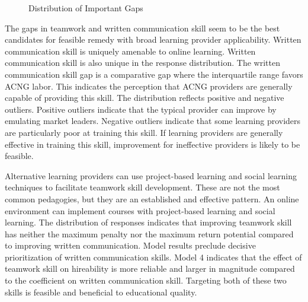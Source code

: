 \documentclass[review]{elsarticle}
\begin{document}
\begin{figure}[h!]
    \centering
    \caption{Distribution of Important Gaps}
    \label{fig:important_gaps}
\end{figure}

The gaps in teamwork and written communication skill seem to be the best candidates for
feasible remedy with broad learning provider applicability.
Written communication skill is uniquely amenable to online learning.
Written communication skill is also unique in the response distribution.
The written communication skill gap is a comparative gap where the interquartile range favors ACNG labor.
This indicates the perception that ACNG providers are generally capable of providing this skill.
The distribution reflects positive and negative outliers.
Positive outliers indicate that the typical provider can improve by emulating market leaders.
Negative outliers indicate that some learning providers are particularly poor at training this skill.
If learning providers are generally effective in training this skill,
improvement for ineffective providers is likely to be feasible.

Alternative learning providers can use project-based learning and social learning
techniques to facilitate teamwork skill development.
These are not the most common pedagogies, but they are an established and effective pattern.
An online environment can implement courses with project-based learning and social learning.
The distribution of responses indicates that improving teamwork skill has neither the maximum
penalty nor the maximum return potential compared to improving written communication.
Model results preclude decisive prioritization of written communication skills. 
Model 4 indicates that the effect of teamwork skill on hireability is more reliable
and larger in magnitude compared to the coefficient on written communication skill.
Targeting both of these two skills is feasible and beneficial to educational quality.
\end{document}
